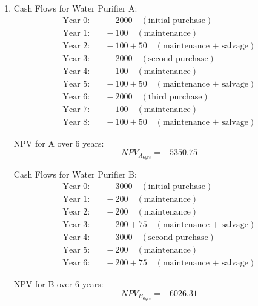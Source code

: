 \documentclass[a4paper]{article}
\begin{document}
\begin{enumerate}
\begin{enumerate}
        \vspace{15mm}
        \item Cash Flows for Water Purifier A:
        \begin{align*}
            \text{Year 0:} & \quad -2000 \quad (\text{initial purchase}) \\
            \text{Year 1:} & \quad -100 \quad (\text{maintenance}) \\
            \text{Year 2:} & \quad -100 + 50 \quad (\text{maintenance + salvage}) \\
            \text{Year 3:} & \quad -2000 \quad (\text{second purchase}) \\
            \text{Year 4:} & \quad -100 \quad (\text{maintenance}) \\
            \text{Year 5:} & \quad -100 + 50 \quad (\text{maintenance + salvage}) \\
            \text{Year 6:} & \quad -2000 \quad (\text{third purchase}) \\
            \text{Year 7:} & \quad -100 \quad (\text{maintenance}) \\
            \text{Year 8:} & \quad -100 + 50 \quad (\text{maintenance + salvage})
        \end{align*}
                
        NPV for A over 6 years:
        \[
        NPV_{A_{6yrs}} = -5350.75
        \]
        
        \vspace{5mm}
        Cash Flows for Water Purifier B:
        \begin{align*}
            \text{Year 0:} & \quad -3000 \quad (\text{initial purchase}) \\
            \text{Year 1:} & \quad -200 \quad (\text{maintenance}) \\
            \text{Year 2:} & \quad -200 \quad (\text{maintenance}) \\
            \text{Year 3:} & \quad -200 + 75 \quad (\text{maintenance + salvage}) \\
            \text{Year 4:} & \quad -3000 \quad (\text{second purchase}) \\
            \text{Year 5:} & \quad -200 \quad (\text{maintenance}) \\
            \text{Year 6:} & \quad -200 + 75 \quad (\text{maintenance + salvage})
        \end{align*}

        NPV for B over 6 years:
        \[
        NPV_{B_{6yrs}} = -6026.31
        \]


\end{enumerate}
\end{enumerate}
\end{document}
